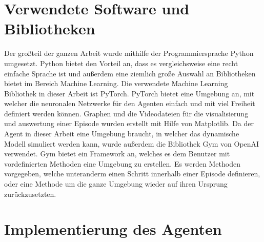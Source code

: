 \documentclass[]{iat}
\begin{document}
\section{Verwendete Software und Bibliotheken}
Der großteil der ganzen Arbeit wurde mithilfe der Programmiersprache Python umgesetzt. Python bietet den Vorteil an, dass es vergleichsweise eine recht einfache Sprache ist und außerdem eine ziemlich große Auswahl an Bibliotheken bietet im Bereich Machine Learning. Die verwendete Machine Learning Bibliothek in dieser Arbeit ist PyTorch. PyTorch bietet eine Umgebung an, mit welcher die neuronalen Netzwerke für den Agenten einfach und mit viel Freiheit definiert werden können. Graphen und die Videodateien für die visualisierung und auswertung einer Episode wurden erstellt mit Hilfe von Matplotlib. Da der Agent in dieser Arbeit eine Umgebung braucht, in welcher das dynamische Modell simuliert werden kann, wurde außerdem die Bibliothek Gym von OpenAI verwendet. Gym bietet ein Framework an, welches es dem Benutzer mit vordefinierten Methoden eine Umgebung zu erstellen. Es werden Methoden vorgegeben, welche unteranderm einen Schritt innerhalb einer Episode definieren, oder eine Methode um die ganze Umgebung wieder auf ihren Ursprung zurückzusetzten.
\section{Implementierung des Agenten}
\end{document}
